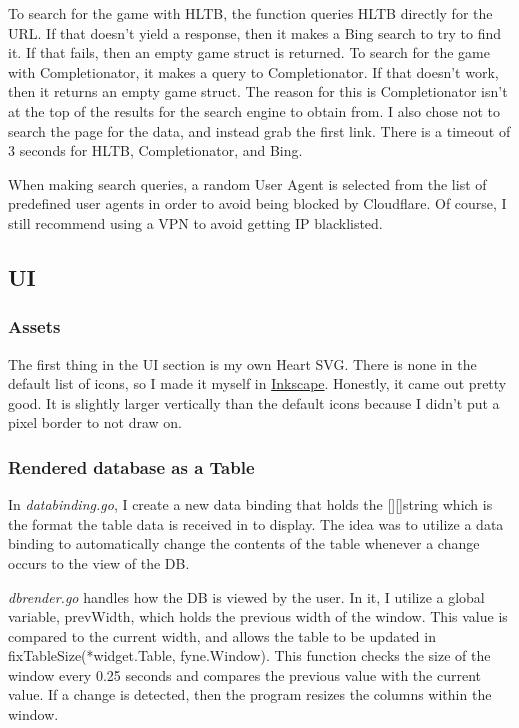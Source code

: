 To search for the game with HLTB, the function queries HLTB directly for
the URL. If that doesn't yield a response, then it makes a Bing
search to try to find it.
If that fails, then an empty game struct is returned. To search
for the game with Completionator, it makes a query to Completionator.
If that doesn't work, then it returns an empty game struct.
The reason for this is Completionator isn't at the top of the
results for the search engine to obtain from. I also chose not to
search the page for the data, and instead grab the first link. There
is a timeout of 3 seconds for HLTB, Completionator, and Bing.

When making search queries, a random User Agent is selected from the
list of predefined user agents in order to avoid being blocked by
Cloudflare. Of course, I still recommend using a VPN to avoid getting
IP blacklisted.

\subsection{UI}
\label{subsec:UI}

\subsubsection{Assets}
\label{subsubsec:Assets}

The first thing in the UI section is my own Heart SVG. There is none
in the default list of icons, so I made it myself in
\href{https://inkscape.org/}{Inkscape}.
Honestly, it came out pretty good. It is slightly larger vertically
than the default icons because I didn't put a pixel border to not draw on.

\subsubsection{Rendered database as a Table}

In \textit{databinding.go}, I create a new data binding that holds
the [][]string which is the format the table data is received in to
display. The idea was to utilize a data binding to automatically
change the contents of the table whenever a change occurs to the view of the DB.

\textit{dbrender.go} handles how the DB is viewed by the user.
In it, I utilize a global variable, prevWidth, which holds the
previous width of the window. This value is compared to the current
width, and allows the table to be updated in
fixTableSize(*widget.Table, fyne.Window).
This function checks the size of the window every 0.25 seconds and
compares the previous value with the current value. If a change is
detected, then the program resizes the columns within the window.

